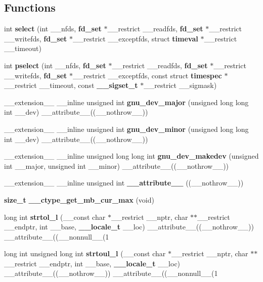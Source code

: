 \subsection*{Functions}
\begin{DoxyCompactItemize}
\item 
int {\bf select} (int \_\-\_\-nfds, {\bf fd\_\-set} $\ast$\_\-\_\-restrict \_\-\_\-readfds, {\bf fd\_\-set} $\ast$\_\-\_\-restrict \_\-\_\-writefds, {\bf fd\_\-set} $\ast$\_\-\_\-restrict \_\-\_\-exceptfds, struct {\bf timeval} $\ast$\_\-\_\-restrict \_\-\_\-timeout)
\item 
int {\bf pselect} (int \_\-\_\-nfds, {\bf fd\_\-set} $\ast$\_\-\_\-restrict \_\-\_\-readfds, {\bf fd\_\-set} $\ast$\_\-\_\-restrict \_\-\_\-writefds, {\bf fd\_\-set} $\ast$\_\-\_\-restrict \_\-\_\-exceptfds, const struct {\bf timespec} $\ast$\_\-\_\-restrict \_\-\_\-timeout, const {\bf \_\-\_\-sigset\_\-t} $\ast$\_\-\_\-restrict \_\-\_\-sigmask)
\item 
\_\-\_\-extension\_\-\_\- \_\-\_\-inline unsigned int {\bf gnu\_\-dev\_\-major} (unsigned long long int \_\-\_\-dev) \_\-\_\-attribute\_\-\_\-((\_\-\_\-nothrow\_\-\_\-))
\item 
\_\-\_\-extension\_\-\_\- \_\-\_\-inline unsigned int {\bf gnu\_\-dev\_\-minor} (unsigned long long int \_\-\_\-dev) \_\-\_\-attribute\_\-\_\-((\_\-\_\-nothrow\_\-\_\-))
\item 
\_\-\_\-extension\_\-\_\- \_\-\_\-inline unsigned long long int {\bf gnu\_\-dev\_\-makedev} (unsigned int \_\-\_\-major, unsigned int \_\-\_\-minor) \_\-\_\-attribute\_\-\_\-((\_\-\_\-nothrow\_\-\_\-))
\item 
\_\-\_\-extension\_\-\_\- \_\-\_\-inline unsigned int {\bf \_\-\_\-attribute\_\-\_\-} ((\_\-\_\-nothrow\_\-\_\-))
\item 
{\bf size\_\-t} {\bf \_\-\_\-ctype\_\-get\_\-mb\_\-cur\_\-max} (void)
\item 
long int {\bf strtol\_\-l} (\_\-\_\-const char $\ast$\_\-\_\-restrict \_\-\_\-nptr, char $\ast$$\ast$\_\-\_\-restrict \_\-\_\-endptr, int \_\-\_\-base, {\bf \_\-\_\-locale\_\-t} \_\-\_\-loc) \_\-\_\-attribute\_\-\_\-((\_\-\_\-nothrow\_\-\_\-)) \_\-\_\-attribute\_\-\_\-((\_\-\_\-nonnull\_\-\_\-(1
\item 
long int unsigned long int {\bf strtoul\_\-l} (\_\-\_\-const char $\ast$\_\-\_\-restrict \_\-\_\-nptr, char $\ast$$\ast$\_\-\_\-restrict \_\-\_\-endptr, int \_\-\_\-base, {\bf \_\-\_\-locale\_\-t} \_\-\_\-loc) \_\-\_\-attribute\_\-\_\-((\_\-\_\-nothrow\_\-\_\-)) \_\-\_\-attribute\_\-\_\-((\_\-\_\-nonnull\_\-\_\-(1

\end{DoxyCompactItemize}
